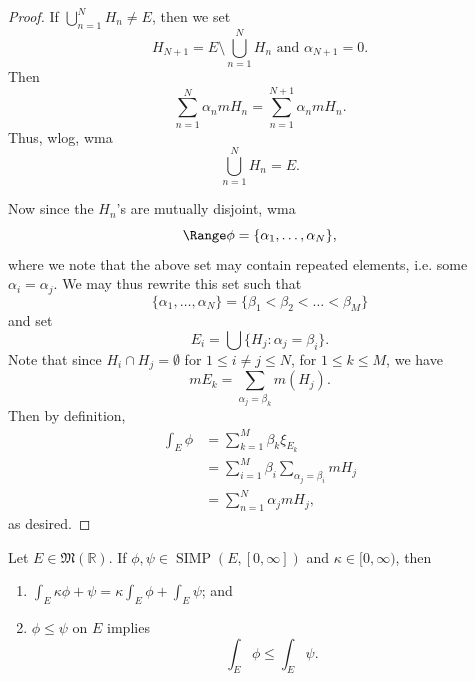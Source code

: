 \documentclass[notoc,notitlepage]{tufte-book}
\DeclareMathOperator{\SIMP}{SIMP}
\begin{document}
\begin{proof}
   If
  $\bigcup_{n=1}^{N} H_n \neq E$, then we set
  \begin{equation*}
    H_{N + 1} = E \setminus \bigcup_{n=1}^{N} H_n \text{ and } \alpha_{N+1} = 0.
  \end{equation*}
  Then
  \begin{equation*}
    \sum_{n=1}^{N} \alpha_n mH_n = \sum_{n=1}^{N+1} \alpha_n mH_n.
  \end{equation*}
  Thus, wlog, wma
  \begin{equation*}
    \bigcup_{n=1}^{N} H_n = E.
  \end{equation*}

  Now since the $H_n$'s are mutually disjoint, wma
  \begin{equation*}
    \Range \phi = \{ \alpha_1, \ldots, \alpha_N \},
  \end{equation*}
  where we note that the above set may contain repeated elements, i.e. some
  $\alpha_i = \alpha_j$. We may thus rewrite this set such that
  \begin{equation*}
    \{ \alpha_1, \ldots, \alpha_N \} = \{ \beta_1 < \beta_2 < \hdots < \beta_M
    \}
  \end{equation*}
  and set
  \begin{equation*}
    E_i = \bigcup \{ H_j : \alpha_j = \beta_i \}.
  \end{equation*}
  Note that since $H_i \cap H_j = \emptyset$ for $1 \leq i \neq j \leq N$, for
  $1 \leq k \leq M$, we have 
  \begin{equation*}
    m E_k = \sum_{\alpha_j = \beta_k} m(H_j).
  \end{equation*}
  Then by definition,
  \begin{align*}
    \int_{E} \phi
    &= \sum_{k=1}^{M} \beta_k \xi_{E_k} \\
    &= \sum_{i=1}^{M} \beta_i \sum_{\alpha_j = \beta_i} mH_j \\
    &= \sum_{n=1}^{N} \alpha_j mH_j,
  \end{align*}
  as desired.
\end{proof}

\begin{propo}\label{propo:linearity_and_monotonicity_of_the_integral_of_simple_functions}
  Let $E \in \mathfrak{M}(\mathbb{R})$. If $\phi, \psi \in \SIMP(E, [0,
  \infty])$ and $\kappa \in [0, \infty)$, then
   \begin{enumerate}
    \item $\int_{E} \kappa \phi + \psi = \kappa \int_{E} \phi + \int_{E} \psi$; and
    \item $\phi \leq \psi$ on $E$ implies
      \begin{equation*}
        \int_{E} \phi \leq \int_{E} \psi.
      \end{equation*}
  \end{enumerate}
\end{propo}
\end{document}
